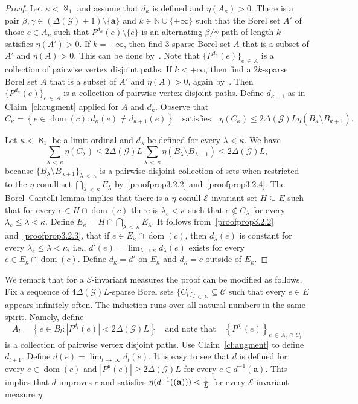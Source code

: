 \documentclass[AHL,Unicode,longabstracts,published]{cedram}
\DeclareMathOperator{\dom}{dom}
\newcommand{\bfa}{\mathbf{a}}
\newcommand{\clG}{\mathcal{G}}
\newcommand{\clE}{\mathcal{E}}
\newcommand{\clC}{\mathcal{C}}
\newcommand{\bbZ}{\mathbb{N}}
\newcommand{\clG}{\mathcal{G}}
\begin{document}
\begin{proof}
Let $\kappa<\aleph_1$ and assume that $d_\kappa$ is defined and $\eta(A_\kappa)>0$. There is a pair $\beta,\gamma\in (\Delta(\clG)+1)\setminus \{\bfa\}$ and $k\in \bbZ\cup \{+\infty\}$ such that the Borel set $A'$ of those $e\in A_\kappa$ such that $P^{d_\kappa}(e)\setminus \{e\}$ is an alternating $\beta/\gamma$ path of length $k$ satisfies $\eta(A')>0$. If $k=+\infty$, then find $3$-sparse Borel set $A$ that is a subset of $A'$ and $\eta(A)>0$. This can be done by~\cite[Proposition~4.6]{KST}. Note that $\{P^{d_\kappa}(e)\}_{e\,\in\,A}$ is a collection of pairwise vertex disjoint paths. If $k<+\infty$, then find a $2k$-sparse Borel set $A$ that is a subset of $A'$ and $\eta(A)>0$, again by~\cite[Proposition~4.6]{KST}. Then $\{P^{d_\kappa}(e)\}_{e\,\in\,A}$ is a collection of pairwise vertex disjoint paths. Define $d_{\kappa+1}$ as in Claim~\ref{cl:augment} applied for $A$ and $d_\kappa$. Observe that
\[
C_\kappa=\left\{e\in \dom(c): d_{\kappa}(e)\not=d_{\kappa+1}(e)\right\}\quad\text{satisfies}\quad\eta(C_\kappa)\le 2\Delta(\clG) L\eta\left(B_\kappa\setminus B_{\kappa+1}\right).
\]

Let $\kappa<\aleph_1$ be a limit ordinal and $d_\lambda$ be defined for every $\lambda<\kappa$. We have
\[
\sum_{\lambda\,<\,\kappa}\eta(C_\lambda)\le 2\Delta(\clG) L\sum_{\lambda\,<\,\kappa}\eta\left(B_\lambda\setminus B_{\lambda+1}\right)\le 2\Delta(\clG) L,
\]
because $\{B_\lambda\setminus B_{\lambda+1}\}_{\lambda\,<\,\kappa}$ is a pairwise disjoint collection of sets when restricted to the $\eta$-conull set $\bigcap_{\lambda\,<\,\kappa}E_\lambda$ by~\eqref{proofprop3.2.2} and~\eqref{proofprop3.2.4}. The Borel--Cantelli lemma implies that there is a $\eta$-conull $\clE$-invariant set $H\subseteq E$ such that for every $e\in H\cap \dom(c)$ there is $\lambda_e<\kappa$ such that $e\not \in C_\lambda$ for every $\lambda_e\le \lambda<\kappa$. Define $E_\kappa=H\cap \bigcap_{\lambda\,<\,\kappa} E_{\lambda}$. It follows from~\eqref{proofprop3.2.2} and~\eqref{proofprop3.2.3}, that if $e\in E_\kappa\cap \dom(c)$, then $d_\lambda(e)$ is constant for every $\lambda_e\le \lambda <\kappa$, i.e., $d'(e)=\lim_{\lambda\to \kappa}d_{\lambda}(e)$ exists for every $e\in E_\kappa\cap \dom(c)$. Define $d_\kappa=d'$ on $E_\kappa$ and $d_\kappa=c$ outside of $E_\kappa$.
\end{proof}

We remark that for a $\clE$-invariant measures the proof can be modified as follows. Fix a sequence of $4\Delta(\clG)L$-sparse Borel sets $\{C_l\}_{l\,\in\,\bbZ}\subseteq \clC$ such that every $e\in E$ appears infinitely often. The induction runs over all natural numbers in the same spirit. Namely, define
\[
A_l=\left\{e\in B_l: \left|P^{d_l}(e)\right|<2\Delta(\clG)L\right\}\quad \text{and note that} \quad\left\{P^{d_l}(e)\right\}_{e\,\in\,A_l\,\cap\,C_l}
\]
is a collection of pairwise vertex disjoint paths. Use Claim~\ref{cl:augment} to define $d_{l+1}$. Define $d(e)=\lim_{l\,\to\,\infty} d_l(e)$. It is easy to see that $d$ is defined for every $e\in \dom(c)$ and $|P^d(e)|\ge 2\Delta(\clG)L$ for every $e\in d^{-1}(\bfa)$. This implies that $d$ improves $c$ and satisfies $\eta(d^{-1}({\bf(a)}))<\frac{1}{L}$ for every $\clE$-invariant measure $\eta$.
\end{document}
